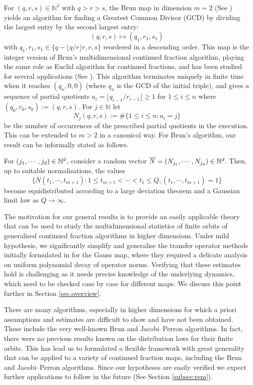 \documentclass[12pt,a4paper,reqno]{amsart}
\begin{document}
For $(q,r,s) \in \mathbb{N}^3$ with $q>r>s$, the Brun map in dimension $m=2$  (See \cite{Brun19,Brun20,BRUN}) yields an algorithm for finding a Greatest Common Divisor (GCD) by dividing the largest entry by the second largest entry:
\[ (q,r,s) \longmapsto (q_1,r_1,s_1) \]
with $q_1,r_1,s_1 \in \{q-\lfloor q/r \rfloor r, r, s\}$ reordered in a descending order.  This map is the integer version of  Brun's multidimensional continued fraction algorithm, 
playing the same role  as  Euclid algorithm for continued fractions, and has been  studied  for   several applications (See  \cite{Ro,Wen2018}). This  algorithm terminates uniquely in finite time when it reaches $(q_n, 0, 0)$ (where $q_n$ is the GCD of  the initial  triple), and gives a sequence of partial quotients $a_i=\lfloor q_{i-1}/r_{i-1} \rfloor \geq 1$ for $1\leq i \leq n$ where $(q_0,r_0,s_0):=(q,r,s)$. For $j \in \mathbb{N}$ let
\[ N_j(q,r,s):= \#\{1 \leq i \leq n: a_i=j \}  \] 
be the number of occurrences of the prescribed partial quotients in the execution. This can be extended to $m>2$ in a canonical way. For Brun's algorithm, our result can be informally stated as follows. 
\begin{theorem} \label{motif:brun}
For $(j_1, \cdots, j_d) \in {\mathbb N}^d$, consider a random vector $\overline{N}=(N_{j_1}, \cdots, N_{j_d}) \in {\mathbb N}^d$. Then, up to suitable normalisations, the values
\[ \{ \overline{N}(t_1,\cdots, t_{m+1}): 1\leq t_{m+1}< \cdots <t_1 \leq Q , (t_1, \cdots ,t_{m+1})=1\} \]
become equidistributed according to a large deviation theorem and a Gaussian limit law as $Q \rightarrow \infty$.
\end{theorem}

The motivation for our general results is to provide an easily applicable theory that can be used to study the multidimensional statistics of finite orbits of generalised continued fraction algorithms in higher dimensions. Under mild hypothesis, we significantly simplify and generalise the transfer operator methods initially formulated in \cite{baladi-vallee} for the Gauss map, where they required a delicate analysis on uniform polynomial decay of operator norms. Verifying that these estimates hold is challenging as it needs precise knowledge of the underlying dynamics, which need to be checked case by case for different maps.  We discuss this point further in Section \ref{sec.overview}.

There are many algorithms, especially in higher dimensions for which a priori assumptions and estimates are difficult to show and have not been obtained. These include the very well-known Brun and Jacobi--Perron algorithms. In fact, there were no previous results known on the distribution  laws for their finite orbits. This has lead us to formulated a flexible framework with great generality that can be applied to a variety of continued fraction maps, including  the Brun and Jacobi--Perron algorithms. Since our hypotheses are easily  verified we expect further applications to follow in the future (See Section \ref{subsec:rem}).
\end{document}
